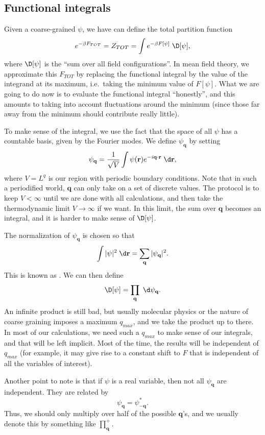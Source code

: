 \documentclass[a4paper]{article}
\begin{document}
\subsection{Functional integrals}
Given a coarse-grained $\psi$, we have can define the total partition function
\[
  e^{-\beta F_{TOT}} = Z_{TOT} = \int e^{-\beta F[\psi]} \;\D [\psi],
\]
where $\D [\psi]$ is the ``sum over all field configurations''. In mean field theory, we approximate this $F_{TOT}$ by replacing the functional integral by the value of the integrand at its maximum, i.e.\ taking the minimum value of $F[\psi]$. What we are going to do now is to evaluate the functional integral ``honestly'', and this amounts to taking into account fluctuations around the minimum (since those far away from the minimum should contribute really little).

To make sense of the integral, we use the fact that the space of all $\psi$ has a countable basis, given by the Fourier modes. We define $\psi_\mathbf{q}$ by setting
\[
  \psi_\mathbf{q} = \frac{1}{\sqrt{V}} \int \psi(\mathbf{r}) e^{-i\mathbf{q}\cdot \mathbf{r}}\;\d \mathbf{r},
\]
where $V = L^q$ is our region with periodic boundary conditions. Note that in such a periodified world, $\mathbf{q}$ can only take on a set of discrete values. The protocol is to keep $V < \infty$ until we are done with all calculations, and then take the thermodynamic limit $V \to \infty$ if we want. In this limit, the sum over $\mathbf{q}$ becomes an integral, and it is harder to make sense of $\D[\psi]$.

The normalization of $\psi_\mathbf{q}$ is chosen so that
\[
  \int |\psi|^2 \;\d \mathbf{r} = \sum_{\mathbf{q} } |\psi_\mathbf{q}|^2.
\]
This is known as . We can then define
\[
  \D [\psi] = \prod_{\mathbf{q}} \;\d \psi_\mathbf{q}.
\]
An infinite product is still bad, but usually molecular physics or the nature of coarse graining imposes a maximum $q_{max}$, and we take the product up to there. In most of our calculations, we need such a $q_{max}$ to make sense of our integrals, and that will be left implicit. Most of the time, the results will be independent of $q_{max}$ (for example, it may give rise to a constant shift to $F$ that is independent of all the variables of interest).

Another point to note is that if $\psi$ is a real variable, then not all $\psi_\mathbf{q}$ are independent. They are related by
\[
  \psi_\mathbf{q} = \psi_{-\mathbf{q}}^*.
\]
Thus, we should only multiply over half of the possible $\mathbf{q}$'s, and we usually denote this by something like $\prod^+_{\mathbf{q}}$.
\end{document}
